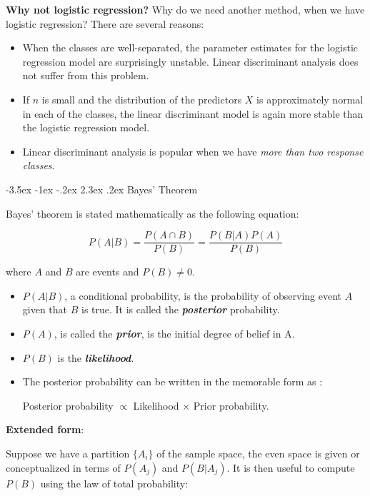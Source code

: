 \documentclass[]{book}
\makeatletter
\providecommand{\tightlist}{%
  \setlength{\itemsep}{0pt}\setlength{\parskip}{0pt}}
\newenvironment{rmdblock}[1]
  {\begin{shaded*}
  \begin{itemize}
  \renewcommand{\labelitemi}{
    \raisebox{-.7\height}[0pt][0pt]{
      {\setkeys{Gin}{width=2em,keepaspectratio}\texttt{[image: img/icons/\#1]}}
    }
  }
  \item
  }
  {
  \end{itemize}
  \end{shaded*}
  }
\newenvironment{rmdinsight}
  {\begin{rmdblock}{insight}}
  {\end{rmdblock}}
\renewcommand\section{\@startsection {section}{1}{\z@}%
                                   {-3.5ex \@plus -1ex \@minus -.2ex}%
                                   {2.3ex \@plus.2ex}%
                                   {\normalfont\Large\bfseries\color{ForestGreen}}}
\theoremstyle{definition}
\theoremstyle{definition}
\theoremstyle{definition}
\theoremstyle{remark}
\makeatother
\begin{document}
\textbf{Why not logistic regression?} Why do we need another method,
when we have logistic regression? There are several reasons:

\begin{itemize}
\tightlist
\item
  When the classes are well-separated, the parameter estimates for the
  logistic regression model are surprisingly unstable. Linear
  discriminant analysis does not suﬀer from this problem.
\item
  If \(n\) is small and the distribution of the predictors \(X\) is
  approximately normal in each of the classes, the linear discriminant
  model is again more stable than the logistic regression model.
\item
  Linear discriminant analysis is popular when we have \emph{more than
  two response classes}.
\end{itemize}

\section{Bayes' Theorem}\label{bayes-theorem}

Bayes' theorem is stated mathematically as the following equation:

\[ P(A | B) = \frac{P(A \cap B)}{P(B)} =  \frac{P(B|A) P(A)}{P(B)}\]

where \(A\) and \(B\) are events and \(P(B) \neq 0\).

\begin{itemize}
\tightlist
\item
  \(P(A | B)\), a conditional probability, is the probability of
  observing event \(A\) given that \(B\) is true. It is called the
  \textbf{\emph{posterior}} probability.
\item
  \(P(A)\), is called the \textbf{\emph{prior}}, is the initial degree
  of belief in A.
\item
  \(P(B)\) is the \textbf{\emph{likelihood}}.
\end{itemize}

\begin{rmdinsight}
The posterior probability can be written in the memorable form as :

Posterior probability \(\propto\) Likelihood \(\times\) Prior
probability.
\end{rmdinsight}

\textbf{Extended form}:

Suppose we have a partition \(\{A_i\}\) of the sample space, the even
space is given or conceptualized in terms of \(P(A_j)\) and
\(P(B | A_j)\). It is then useful to compute \(P(B)\) using the law of
total probability:
\end{document}
